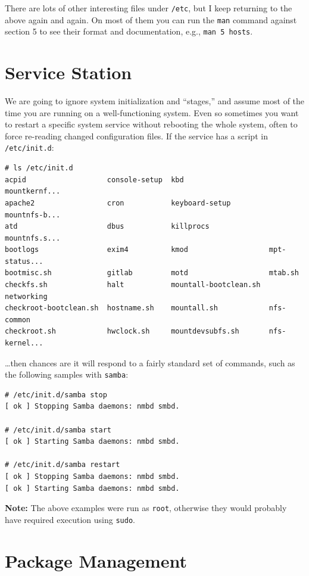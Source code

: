 \documentclass[10pt,]{book}
\numberwithin{figure}{chapter}
\begin{document}
There are lots of other interesting files under \texttt{/etc}, but I
keep returning to the above again and again. On most of them you can run
the \texttt{man} command against section 5 to see their format and
documentation, e.g., \texttt{man 5 hosts}.

\section{Service Station}\label{service-station}

We are going to ignore system initialization and ``stages,'' and assume
most of the time you are running on a well-functioning system. Even so
sometimes you want to restart a specific system service without
rebooting the whole system, often to force re-reading changed
configuration files. If the service has a script in
\texttt{/etc/init.d}:

\begin{verbatim}
# ls /etc/init.d
acpid                   console-setup  kbd                    mountkernf...
apache2                 cron           keyboard-setup         mountnfs-b...
atd                     dbus           killprocs              mountnfs.s...
bootlogs                exim4          kmod                   mpt-status...
bootmisc.sh             gitlab         motd                   mtab.sh
checkfs.sh              halt           mountall-bootclean.sh  networking
checkroot-bootclean.sh  hostname.sh    mountall.sh            nfs-common
checkroot.sh            hwclock.sh     mountdevsubfs.sh       nfs-kernel...
\end{verbatim}

\ldots{}then chances are it will respond to a fairly standard set of
commands, such as the following samples with \texttt{samba}:

\begin{verbatim}
# /etc/init.d/samba stop
[ ok ] Stopping Samba daemons: nmbd smbd.

# /etc/init.d/samba start
[ ok ] Starting Samba daemons: nmbd smbd.

# /etc/init.d/samba restart
[ ok ] Stopping Samba daemons: nmbd smbd.
[ ok ] Starting Samba daemons: nmbd smbd.
\end{verbatim}

\textbf{Note:} The above examples were run as \texttt{root}, otherwise
they would probably have required execution using \texttt{sudo}.

\section{Package Management}\label{package-management}
\end{document}
